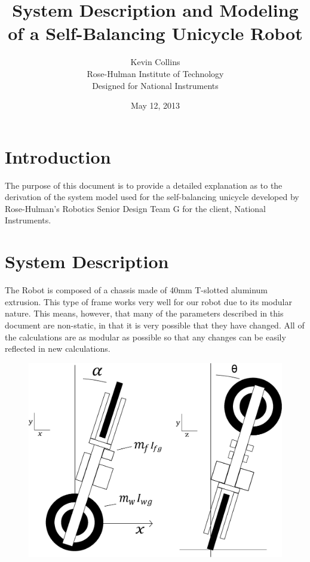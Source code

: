 \documentclass{article}
\begin{document}
\begin{titlepage}
\title{System Description and Modeling of a Self-Balancing Unicycle Robot}
\author{Kevin Collins \\ Rose-Hulman Institute of Technology \\Designed for National Instruments}
\date{May 12, 2013}
\end{titlepage}

\maketitle
\newpage

\section{Introduction}
The purpose of this document is to provide a detailed explanation as to the derivation of the system model used for the self-balancing unicycle developed by Rose-Hulman's Robotics Senior Design Team G for the client, National Instruments.

\section{System Description}
The Robot is composed of a chassis made of 40mm T-slotted aluminum extrusion.  This type of frame works very well for our robot due to its modular nature.  This means, however, that many of the parameters described in this document are non-static, in that it is very possible that they have changed.  All of the calculations are as modular as possible so that any changes can be easily reflected in new calculations.  


\begin{figure}[h]
\centering
\includegraphics[scale=0.4]{systemDescriptioinDiagram}
\end{figure}
\end{document}

